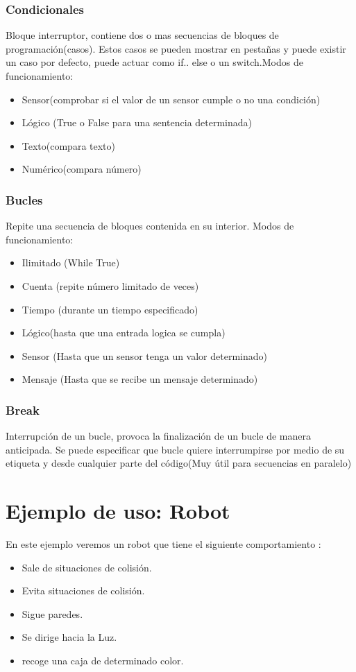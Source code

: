 \documentclass[12pt,a4paper]{article}
\begin{document}
\subsubsection{Condicionales}
Bloque interruptor, contiene dos o mas secuencias de bloques de programación(casos). Estos casos se pueden mostrar en pestañas y puede existir un caso por defecto, puede actuar como if.. else o un switch.Modos de funcionamiento:
\begin{itemize}
\item Sensor(comprobar si el valor de un sensor cumple o no una condición)
\item Lógico (True o False para una sentencia determinada)
\item Texto(compara texto)
\item Numérico(compara número)
\end{itemize}
\subsubsection{Bucles}
Repite una secuencia de bloques contenida en su interior.
Modos de funcionamiento:
\begin{itemize}
\item Ilimitado (While True)
\item Cuenta (repite número limitado de veces)
\item Tiempo (durante un tiempo especificado)
\item Lógico(hasta que una entrada logica se cumpla)
\item Sensor (Hasta que un sensor tenga un valor determinado)
\item Mensaje (Hasta que se recibe un mensaje determinado)
\end{itemize}
\subsubsection{Break}
Interrupción de un bucle, provoca la finalización de un bucle de manera anticipada. Se puede especificar que bucle quiere interrumpirse por medio de su etiqueta y desde cualquier parte del código(Muy útil para secuencias en paralelo)
\clearpage 
\section{Ejemplo de uso: Robot }
En este ejemplo veremos un robot que tiene el siguiente comportamiento : 
\begin{itemize}
\item Sale de situaciones de colisión.
\item Evita situaciones de colisión.
\item Sigue paredes.
\item Se dirige hacia la Luz.
\item recoge una caja de determinado color.
\end{itemize}
\end{document}
